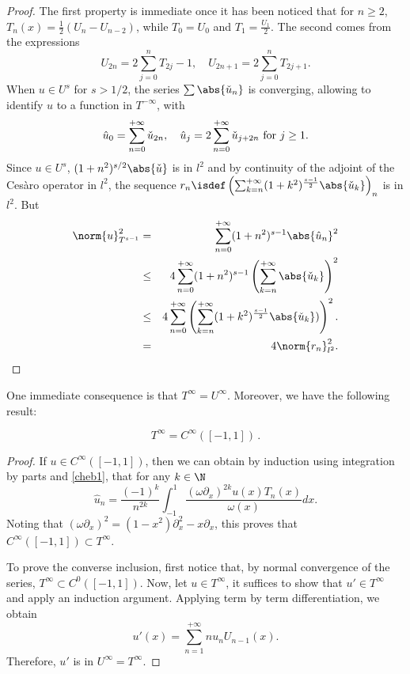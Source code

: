 \documentclass[a4paper]{article}
\begin{document}
	\begin{proof}
		The first property is immediate once it has been noticed that for $n \geq 2$, $T_n(x) = \frac{1}{2}\left(U_n - U_{n-2}\right)$, while $T_0 = U_0$ and $T_1 = \frac{U_ 1}{2}$. The second comes from the expressions
		\[U_{2n} = 2\sum_{j = 0}^n T_{2j} - 1, \quad U_{2n+1} = 2\sum_{j=0}^n T_{2j+1}.\]
		When $u \in U^{s}$ for $s > 1/2$, the series $\sum \abs{\check{u}_n}$ is converging, allowing to identify $u$ to a function in $T^{-\infty}$, with 
		\[\hat{u}_{0} = \sum_{n=0}^{+ \infty} \check{u}_{2n}, \quad  \hat{u}_j = 2\sum_{n=0}^{+\infty} \check{u}_{j + 2n} \textup{ for } j \geq 1.\]
		Since $u \in U^s$, $(1+n^2)^{s/2} \abs{\check{u}}$ is in $l^2$ and by continuity of the adjoint of the Cesàro operator in $l^2$, the sequence $r_n \isdef \left( \sum_{k=n}^{+ \infty} (1+k^2)^{\frac{s-1}{2}} \abs{\check{u}_k}\right)_n$ is in $l^2$. But
		\begin{eqnarray*}
			\norm{u}_{T^{s-1}}^2 &=& \sum_{n=0}^{+ \infty} (1 + n^2)^{s-1} \abs{\hat{u}_n}^2\\ 
			&\leq& 4\sum_{n=0}^{+\infty}(1+n^2)^{s-1} \left(\sum_{k=n}^{+\infty} \abs{\check{u}_k}\right)^2 \\
			&\leq& 4\sum_{n=0}^{+ \infty}\left(\sum_{k=n}^{+\infty}(1+k^2)^{\frac{s-1}{2}} \abs{\check{u}_k})\right)^2.\\
			&=& 4\norm{r_n}^2_{l^2}.
		\end{eqnarray*}	
	\end{proof}
	One immediate consequence is that $T^{\infty} = U^{\infty}$.  Moreover, we have the following result:
	\begin{Lem}
		\[T^{\infty} = C^{\infty}([-1,1])\,.\]
		\label{LemTinfCinf}
	\end{Lem}
	\begin{proof}
		If $u \in C^{\infty}([-1,1])$, then we can obtain by induction using integration by parts and \eqref{cheb1}, that for any $k \in \N$
		\[\hat{u}_n = \frac{(-1)^k}{n^{2k}} \int_{-1}^{1} \dfrac{(\omega\partial_x)^{2k} u(x) T_n(x)}{\omega(x)}dx.\]
		Noting that $(\omega \partial_x)^2 = (1-x^2)\partial_x^2 - x \partial_ x$, this proves that $C^{\infty}([-1,1]) \subset T^{\infty}$. 
		
		To prove the converse inclusion, first notice that, by normal convergence of the series, $T^{\infty} \subset C^0([-1,1]) $. Now, let $u \in T^{\infty}$, it suffices to show that $u' \in T^{\infty}$ and apply an induction argument. Applying term by term differentiation, we obtain
		\[u'(x) = \sum_{n=1}^{+\infty} n u_n U_{n-1}(x).\] 
		Therefore, $u'$ is in $U^{\infty} = T^{\infty}$. 
	\end{proof}
	
\end{document}
